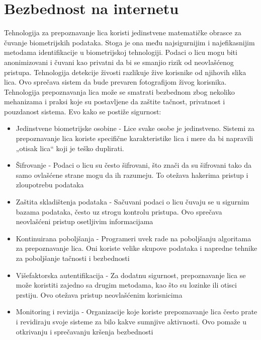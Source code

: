 \documentclass[a4paper]{article}
\begin{document}
\section{Bezbednost na internetu}
\label{sec:Bezbednost na internetu}
Tehnologija za prepoznavanje lica koristi jedinstvene matematičke obrasce za čuvanje biometrijskih podataka. Stoga je ona među najsigurnijim i najefikasnijim metodama identifikacije u biometrijskoj tehnologiji. Podaci o licu mogu biti anonimizovani i čuvani kao privatni da bi se smanjio rizik od neovlašćenog pristupa. Tehnologija detekcije živosti razlikuje žive korisnike od njihovih slika lica. Ovo sprečava sistem da bude prevaren fotografijom živog korisnika.
Tehnologija prepoznavanja lica može se smatrati bezbednom zbog nekoliko mehanizama i praksi koje su postavljene da zaštite tačnost, privatnost i pouzdanost sistema. Evo kako se postiže sigurnost:
\begin{itemize}
\item Jedinstvene biometrijske osobine -
Lice svake osobe je jedinstveno. Sistemi za prepoznavanje lica koriste specifične karakteristike lica i mere da bi napravili „otisak lica“ koji je teško duplirati.
\item  Šifrovanje - Podaci o licu su često šifrovani, što znači da su šifrovani tako da samo ovlašćene strane mogu da ih razumeju. To otežava hakerima pristup i zloupotrebu podataka
\item   Zaštita skladištenja podataka -
Sačuvani podaci o licu čuvaju se u sigurnim bazama podataka, često uz strogu kontrolu pristupa. Ovo sprečava neovlašćeni pristup osetljivim informacijama
\item Kontinuirana poboljšanja -
Programeri uvek rade na poboljšanju algoritama za prepoznavanje lica. Oni koriste velike skupove podataka i napredne tehnike za poboljšanje tačnosti i bezbednosti
\item Višefaktorska autentifikacija -
Za dodatnu sigurnost, prepoznavanje lica se može koristiti zajedno sa drugim metodama, kao što su lozinke ili otisci prstiju. Ovo otežava pristup neovlašćenim korisnicima
\item  Monitoring i revizija -
Organizacije koje koriste prepoznavanje lica često prate i revidiraju svoje sisteme za bilo kakve sumnjive aktivnosti. Ovo pomaže u otkrivanju i sprečavanju kršenja bezbednosti
\end{itemize}  
\end{document}
